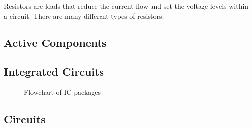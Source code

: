 Resistors are loads that reduce the current flow and set the voltage levels within a circuit. There are many different types of resistors.

\subsection{Active Components}

\subsection{Integrated Circuits}

\begin{figure}[!htb]
    \centering
    
    \caption[IC packages flowchart]{Flowchart of IC packages}
    \label{fig:ic_flowchart}
\end{figure}

\subsection{Circuits}
